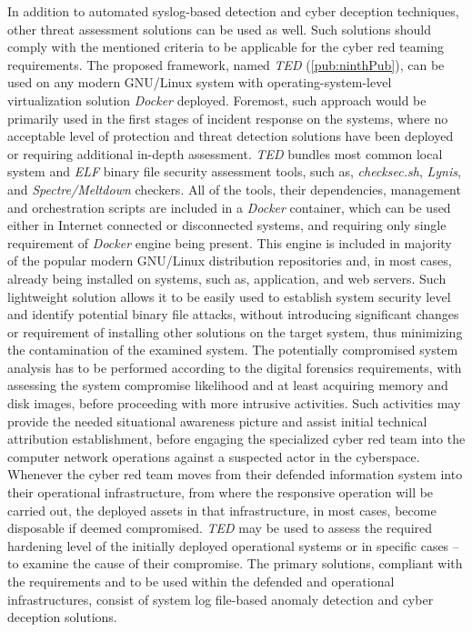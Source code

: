 In addition to automated syslog-based detection and cyber deception techniques, other threat assessment solutions can be used as well. Such solutions should comply with the mentioned criteria to be applicable for the cyber red teaming requirements. The proposed framework, named \textit{TED} (\ref{pub:ninthPub}), can be used on any modern GNU/Linux system with operating-system-level virtualization solution \textit{Docker} deployed. Foremost, such approach would be primarily used in the first stages of incident response on the systems, where no acceptable level of protection and threat detection solutions have been deployed or requiring additional in-depth assessment. \textit{TED} bundles most common local system and \textit{ELF} binary file security assessment tools, such as, \textit{checksec.sh}, \textit{Lynis}, and \textit{Spectre/Meltdown} checkers. All of the tools, their dependencies, management and orchestration scripts are included in a \textit{Docker} container, which can be used either in Internet connected or disconnected systems, and requiring only single requirement of \textit{Docker} engine being present. This engine is included in majority of the popular modern GNU/Linux distribution repositories and, in most cases, already being installed on systems, such as, application, and web servers. Such lightweight solution allows it to be easily used to establish system security level and identify potential binary file attacks, without introducing significant changes or requirement of installing other solutions on the target system, thus minimizing the contamination of the examined system. The potentially compromised system analysis has to be performed according to the digital forensics requirements, with assessing the system compromise likelihood and at least acquiring memory and disk images, before proceeding with more intrusive activities. Such activities may provide the needed situational awareness picture and assist initial technical attribution establishment, before engaging the specialized cyber red team into the computer network operations against a suspected actor in the cyberspace. Whenever the cyber red team moves from their defended information system into their operational infrastructure, from where the responsive operation will be carried out, the deployed assets in that infrastructure, in most cases, become disposable if deemed compromised. \textit{TED} may be used to assess the required hardening level of the initially deployed operational systems or in specific cases -- to examine the cause of their compromise. The primary solutions, compliant with the requirements and to be used within the defended and operational infrastructures, consist of system log file-based anomaly detection and cyber deception solutions.


